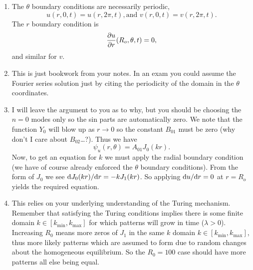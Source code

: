 \documentclass[a4paper, 12pt]{article}
\begin{document}
\begin{enumerate}[label={\bf \arabic{*}.\;}, ref={\arabic{*}},itemsep=3ex, left=0ex]
{\begin{enumerate}[label=(\alph*)]
{          }
      \end{enumerate}
    }
    {
      \begin{enumerate}[label=(\alph*)]
        \item{
            The $\theta$ boundary conditions are necessarily periodic,
            \begin{equation}
              u(r,0,t) = u(r,2\pi,t), \mbox{and } v(r,0,t)= v(r,2\pi,t).
            \end{equation}
            The $r$ boundary condition is
            \begin{equation}
              \pd{u}{r}(R_o,\theta,t) =0,
            \end{equation}
            and similar for $v$.
          }
        \item{This is just bookwork from your notes. In an exam you could assume the Fourier series solution just by citing the periodicity of the domain in the $\theta$ coordinates.

          }
        \item{
            I will leave the argument to you as to why, but you should be choosing the $n=0$ modes only so the sin parts are automatically zero. We note that the function $Y_0$ will blow up as $r\rightarrow 0$ so the constant $B_{01}$ must be zero (why don't I care about $B_{02}$\dots?). Thus we have
            \begin{equation}
              \psi_u(r,\theta) = A_{01} J_0(kr).
            \end{equation}
            Now, to get an equation for $k$ we must apply the radial boundary condition (we have of course already enforced the $\theta$ boundary conditions). From the form of $J_0$ we see $\fd{J_0(kr)}{r} = -kJ_1(kr)$. So applying $\fd{u}{r}=0$ at $r=R_o$ yields the required equation.
          }
        \item{

            This relies on your underlying understanding of the Turing mechanism. Remember that satisfying the Turing conditions implies there is some finite domain $k\in[k_{\min},k_{\max}]$ for which patterns will grow in time ($\lambda>0$). Increasing $R_0$ means more zeros of $J_1$ in the same $k$ domain $k\in[k_{\min},k_{\max}]$, thus more likely patterns which are assumed to form due to random changes about the homogeneous equilibrium.  So the $R_0=100$ case should have more patterns all else being equal.
          }
      \end{enumerate}

}
\end{enumerate}
\end{document}
